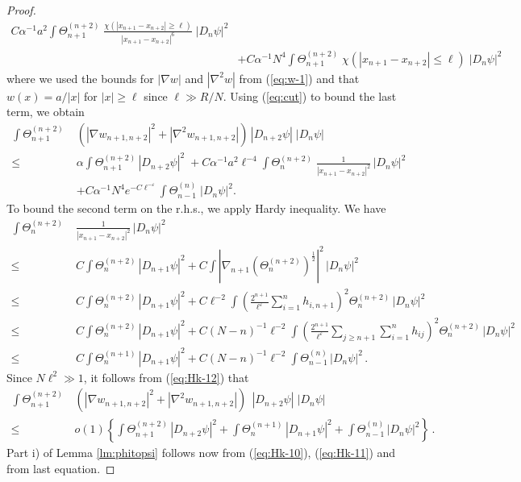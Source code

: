 \documentclass[11pt]{article}
\newcommand{\eps}{\varepsilon}
\renewcommand{\a}{\alpha}
\begin{document}
\begin{proof}
\begin{equation}
\begin{split}
C \a^{-1} a^2 \int \Theta^{(n+2)}_{n+1} \; \frac{\chi
(|x_{n+1}-x_{n+2}| \geq \ell)}{|x_{n+1}-x_{n+2}|^6} \; |D_{n}
\psi|^2
\\ &+C \a^{-1}N^4 \int \Theta^{(n+2)}_{n+1} \; \chi (|x_{n+1}-x_{n+2}|
\leq \ell) \; |D_{n} \psi|^2
\end{split}
\end{equation}
where we used the bounds for $|\nabla w|$ and $|\nabla^2 w|$ from
(\ref{eq:w-1}) and that $w(x) = a/|x|$ for $|x| \geq\ell$ since
$\ell\gg R/N$. Using (\ref{eq:cut}) to bound the last term, we
obtain
\begin{equation}\label{eq:Hk-12}
\begin{split}
 \int \Theta^{(n+2)}_{n+1}
\;&\left( |\nabla w_{n+1,n+2}|^2 + |\nabla^2 w_{n+1,n+2}|\right) \,
|D_{n+2}\psi| \; |D_{n} \psi|
\\ \leq \; &\a  \int \Theta^{(n+2)}_{n+1} \,
|D_{n+2}\psi|^2 \; + C \a^{-1} a^2 \ell^{-4} \int \Theta^{(n+2)}_{n}
\;\frac{1}{|x_{n+1} -x_{n+2}|^2} \, |D_n \psi|^2\,
\\ &
 + C \a^{-1} N^4 e^{-C\ell^{-\eps}}  \int
\Theta^{(n)}_{n-1} \; |D_n \psi|^2 .
\end{split}
\end{equation}
To bound the second term on the r.h.s., we apply Hardy inequality.
We have
\begin{equation}
\begin{split}
\int \Theta^{(n+2)}_{n} \; &\frac{1}{|x_{n+1} -x_{n+2}|^2} \, |D_n
\psi|^2\, \\ \leq \; & C \int \Theta^{(n+2)}_{n} \, |D_{n+1} \psi|^2
+ C \int \left|\nabla_{n+1}
\left(\Theta^{(n+2)}_{n}\right)^{\frac{1}{2}}\right|^2 \, |D_n
\psi|^2 \, \\ \leq \; & C \int \Theta^{(n+2)}_{n} \, |D_{n+1}
\psi|^2 + C \ell^{-2} \int \left(\frac{2^{n+1}}{\ell^{\eps}}
\sum_{i=1}^n h_{i,n+1}\right)^2 \Theta^{(n+2)}_{n} \, |D_n \psi|^2
\\ \leq \; & C \int \Theta^{(n+2)}_{n} \, |D_{n+1} \psi|^2 + C
(N-n)^{-1} \ell^{-2} \int \left(\frac{2^{n+1}}{\ell^{\eps}} \sum_{j
\geq n+1} \sum_{i=1}^n h_{ij}\right)^2 \Theta^{(n+2)}_{n} \, |D_n
\psi|^2
\\ \leq \; & C \int
\Theta^{(n+1)}_{n} \, |D_{n+1} \psi|^2 + C (N-n)^{-1} \ell^{-2} \int
\Theta^{(n)}_{n-1} \, |D_n \psi|^2\,.
\end{split}
\end{equation}
Since $N\ell^{2} \gg 1$, it follows from (\ref{eq:Hk-12}) that
\begin{equation*}
\begin{split}
 \int \Theta^{(n+2)}_{n+1} \, &\left( |\nabla w_{n+1,n+2}|^2 + |\nabla^2 w_{n+1,n+2}|\right)
\; \, |D_{n+2}\psi| \; |D_n \psi| \\ \leq \; &o(1) \left\{ \int
\Theta^{(n+2)}_{n+1} \, |D_{n+2}\psi|^2 + \int \Theta^{(n+1)}_{n} \,
|D_{n+1}\psi|^2 + \int \Theta^{(n)}_{n-1} \, |D_n\psi|^2  \right\}
\,.
\end{split}
\end{equation*}
Part i) of Lemma \ref{lm:phitopsi} follows now from
(\ref{eq:Hk-10}), (\ref{eq:Hk-11}) and from last equation.


\end{proof}
\end{document}
